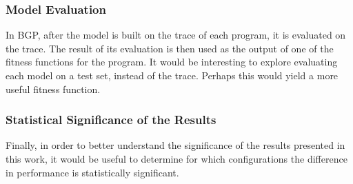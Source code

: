 
\subsubsection{Model Evaluation}
In BGP, after the model is built on the trace of each program, it is evaluated on the trace.  The result of its evaluation is then used as the output of one of the fitness functions for the program.  It would be interesting to explore evaluating each model on a test set, instead of the trace.  Perhaps this would yield a more useful fitness function.

\subsubsection{Statistical Significance of the Results}
Finally, in order to better understand the significance of the results presented in this work, it would be useful to determine for which configurations the difference in performance is statistically significant.

